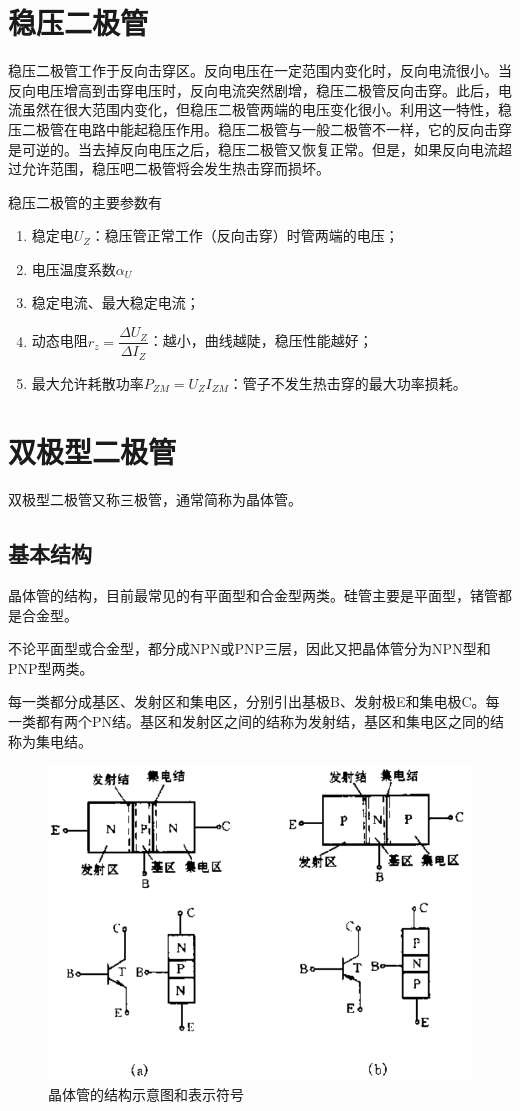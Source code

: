 \documentclass[12pt]{article}
\begin{document}
\section{稳压二极管}

稳压二极管工作于反向击穿区。反向电压在一定范围内变化时，反向电流很小。当反向电压增高到击穿电压时，反向电流突然剧增，稳压二极管反向击穿。此后，电流虽然在很大范围内变化，但稳压二极管两端的电压变化很小。利用这一特性，稳压二极管在电路中能起稳压作用。稳压二极管与一般二极管不一样，它的反向击穿是可逆的。当去掉反向电压之后，稳压二极管又恢复正常。但是，如果反向电流超过允许范围，稳压吧二极管将会发生热击穿而损坏。

稳压二极管的主要参数有

\begin{enumerate}
    \item 稳定电\(U_Z\)：稳压管正常工作（反向击穿）时管两端的电压；
    \item 电压温度系数\(\alpha_U\)
    \item 稳定电流、最大稳定电流；
    \item 动态电阻\(r_z = \dfrac{\Delta U_Z}{\Delta I_Z}\)：越小，曲线越陡，稳压性能越好；
    \item 最大允许耗散功率\(P_{ZM} = U_Z I_{ZM}\)：管子不发生热击穿的最大功率损耗。
\end{enumerate}

\section{双极型二极管}

双极型二极管又称三极管，通常简称为晶体管。

\subsection{基本结构}

晶体管的结构，目前最常见的有平面型和合金型两类。硅管主要是平面型，锗管都是合金型。

不论平面型或合金型，都分成NPN或PNP三层，因此又把晶体管分为NPN型和PNP型两类。

每一类都分成基区、发射区和集电区，分别引出基极B、发射极E和集电极C。每一类都有两个PN结。基区和发射区之间的结称为发射结，基区和集电区之同的结称为集电结。

\begin{figure}[!h]
    \centering
    \includegraphics[width=.6\textwidth]{graphics/Screenshot 2025-09-23 at 12.22.38.png}
    \caption{晶体管的结构示意图和表示符号}
\end{figure}
\end{document}
